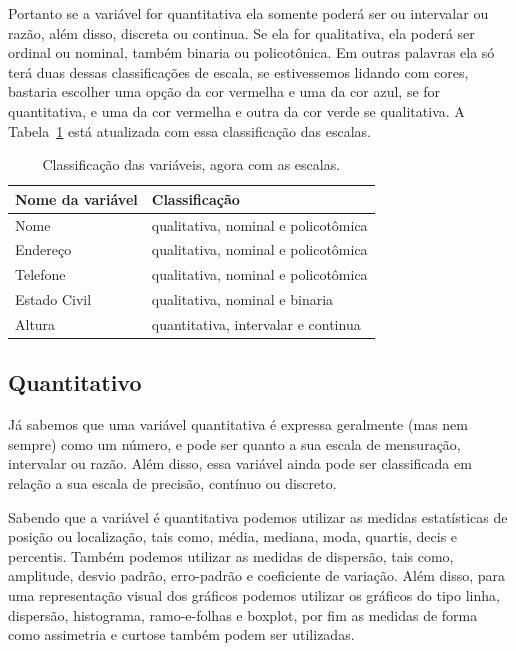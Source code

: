\documentclass[a4paper,12pt]{book}
\begin{document}
Portanto se a variável for quantitativa ela somente poderá ser ou intervalar ou razão, além disso, discreta ou continua. Se ela for qualitativa, ela poderá ser ordinal ou nominal, também  binaria ou policotônica. Em outras palavras ela só terá duas dessas classificações de escala, se estivessemos lidando com cores, bastaria escolher uma opção da cor vermelha e uma da cor azul, se for quantitativa, e uma da cor vermelha e outra da cor verde se qualitativa. A Tabela~\ref{tbl:clienteclassificacaoescala} está atualizada com essa classificação das escalas.

\begin{table}
	\centering
	\caption{Classificação das variáveis, agora com as escalas.}
	\begin{tabular}{|l|l|}
		\hline
		\textbf{Nome da variável} &\textbf{Classificação} \\
		\hline
		Nome & qualitativa, nominal e policotômica  \\
		\hline
		Endereço & qualitativa, nominal e policotômica  \\
		\hline
		Telefone & qualitativa, nominal e policotômica \\
		\hline
		Estado Civil & qualitativa, nominal e binaria \\
		\hline
		Altura & quantitativa, intervalar e continua \\
		\hline
	\end{tabular}
	\label{tbl:clienteclassificacaoescala}
\end{table}

\subsection{Quantitativo}

Já sabemos que uma variável quantitativa é expressa geralmente (mas nem sempre) como um número, e pode ser quanto a sua escala de mensuração, intervalar ou razão. Além disso, essa variável ainda pode ser classificada em relação a sua escala de precisão, contínuo ou discreto.

Sabendo que a variável é quantitativa podemos utilizar as medidas estatísticas de posição ou localização, tais como, média, mediana, moda, quartis, decis e percentis. Também podemos utilizar as medidas de dispersão, tais como, amplitude, desvio padrão, erro-padrão e coeficiente de variação. Além disso, para uma representação visual dos gráficos podemos utilizar os gráficos do tipo linha, dispersão, histograma, ramo-e-folhas e boxplot, por fim as medidas de forma como assimetria e curtose também podem ser utilizadas\cite{favero2017manual}.
\end{document}
